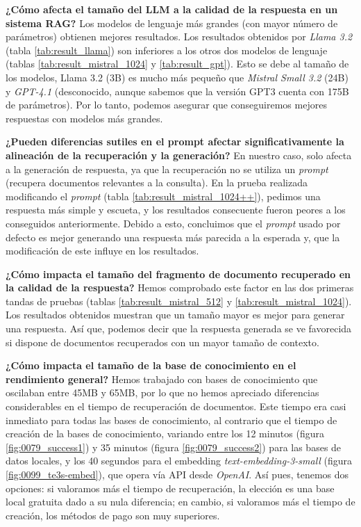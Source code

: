 	   		\noindent\textbf{¿Cómo afecta el tamaño del LLM a la calidad de la respuesta en un sistema RAG?} Los modelos de lenguaje más grandes (con mayor número de parámetros) obtienen mejores resultados. Los resultados obtenidos por \textit{Llama 3.2} (tabla \ref{tab:result_llama}) son inferiores a los otros dos modelos de lenguaje (tablas \ref{tab:result_mistral_1024} y \ref{tab:result_gpt}). Esto se debe al tamaño de los modelos, Llama 3.2 (3B) es mucho más pequeño que \textit{Mistral Small 3.2} (24B) y \textit{GPT-4.1} (desconocido, aunque sabemos que la versión GPT3 cuenta con 175B de parámetros). Por lo tanto, podemos asegurar que conseguiremos mejores respuestas con modelos más grandes.
	   		
	   		\noindent\textbf{¿Pueden diferencias sutiles en el prompt afectar significativamente la alineación de la recuperación y la generación?} En nuestro caso, solo afecta a la generación de respuesta, ya que la recuperación no se utiliza un \textit{prompt} (recupera documentos relevantes a la consulta). En la prueba realizada modificando el \textit{prompt} (tabla \ref{tab:result_mistral_1024++}), pedimos una respuesta más simple y escueta, y los resultados consecuente fueron peores a los conseguidos anteriormente. Debido a esto, concluimos que el \textit{prompt} usado por defecto es mejor generando una respuesta más parecida a la esperada y, que la modificación de este influye en los resultados.
	   		
	   		\noindent\textbf{¿Cómo impacta el tamaño del fragmento de documento recuperado en la calidad de la respuesta?} Hemos comprobado este factor en las dos primeras tandas de pruebas (tablas \ref{tab:result_mistral_512} y \ref{tab:result_mistral_1024}). Los resultados obtenidos muestran que un tamaño mayor es mejor para generar una respuesta. Así que, podemos decir que la respuesta generada se ve favorecida si dispone de documentos recuperados con un mayor tamaño de contexto.
	   		
	   		\noindent\textbf{¿Cómo impacta el tamaño de la base de conocimiento en el rendimiento general?} Hemos trabajado con bases de conocimiento que oscilaban entre 45MB y 65MB, por lo que no hemos apreciado diferencias considerables en el tiempo de recuperación de documentos. Este tiempo era casi inmediato para todas las bases de conocimiento, al contrario que el tiempo de creación de la bases de conocimiento, variando entre los 12 minutos (figura \ref{fig:0079_success1}) y 35 minutos (figura \ref{fig:0079_success2}) para las bases de datos locales, y los 40 segundos para el embedding \textit{text-embedding-3-small} (figura \ref{fig:0099_te3s-embed}), que opera vía API desde \textit{OpenAI}. Así pues, tenemos dos opciones: si valoramos más el tiempo de recuperación, la elección es una base local gratuita dado a su nula diferencia; en cambio, si valoramos más el tiempo de creación, los métodos de pago son muy superiores.   		
	   		    		
